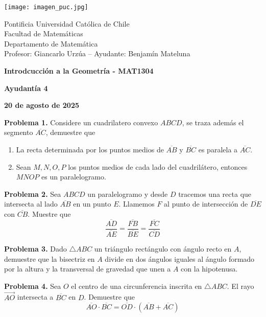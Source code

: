 \documentclass{article}
\begin{document}
\begin{minipage}{2.5cm}
    \texttt{[image: imagen\_puc.jpg]}
\end{minipage}
\begin{minipage}{14cm}
    {\sc Pontificia Universidad Católica de Chile\\
    Facultad de Matemáticas\\
    Departamento de Matemática\\
    Profesor: Giancarlo Urzúa -- Ayudante: Benjamín Mateluna}
\end{minipage}
\vspace{1ex}

{\centerline{\bf Introdcucción a la Geometría - MAT1304}
\centerline{\bf Ayudantía 4}}
\centerline{\bf 20 de agosto de 2025}

\vspace{1cm}
\noindent\textbf{Problema 1.} Considere un cuadrilatero convexo $ABCD$, se traza además el 
segmento $\overline{AC}$, demuestre que
\begin{enumerate}
    \item La recta determinada por los puntos medios de $\overline{AB}$ y $\overline{BC}$ es 
    paralela a $\overline{AC}$.
    
    \item Sean $M,N,O,P$ los puntos medios de cada lado del cuadrilátero, entonces $MNOP$ es un 
    paralelogramo.
\end{enumerate}

\vspace{5mm}
\noindent\textbf{Problema 2.} Sea $ABCD$ un paralelogramo y desde $D$ tracemos una recta que 
intersecta al lado $\overline{AB}$ en un punto $E$. Llamemos $F$ al punto de intersección de 
$\overline{DE}$ con $\overline{CB}$. Muestre que
\begin{equation*}
    \frac{\overline{AD}}{\overline{AE}}=\frac{\overline{FB}}{\overline{BE}}
    =\frac{\overline{FC}}{\overline{CD}}
\end{equation*}

\vspace{5mm}
\noindent\textbf{Problema 3.} Dado $\triangle ABC$ un triángulo rectángulo con ángulo recto en 
$A$, demuestre que la bisectriz en $A$ divide en dos ángulos iguales al ángulo formado por la 
altura y la transversal de gravedad que unen a $A$ con la hipotenusa.

\vspace{5mm}
\noindent\textbf{Problema 4.} Sea $O$ el centro de una circunferencia inscrita en $\triangle ABC$.
El rayo $\overrightarrow{AO}$ intersecta a $\overline{BC}$ en $D$. Demuestre que
\begin{equation*}
    \overline{AO}\cdot\overline{BC}=\overline{OD}\cdot(\overline{AB}+\overline{AC})
\end{equation*}
\end{document}

